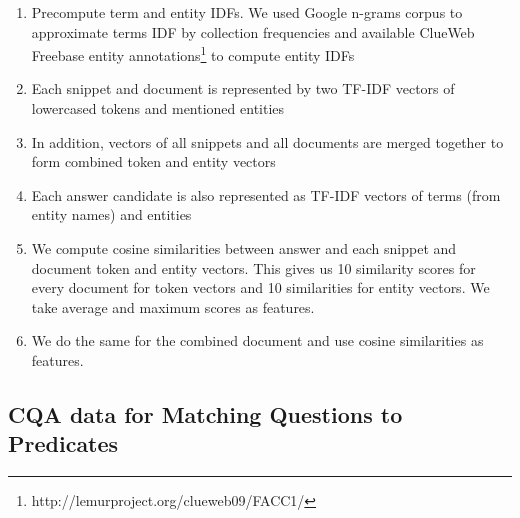 \begin{enumerate}[noitemsep,topsep=0pt]
\item Precompute term and entity IDFs. We used Google n-grams corpus to approximate terms IDF by collection frequencies and available ClueWeb Freebase entity annotations\footnote{http://lemurproject.org/clueweb09/FACC1/} to compute entity IDFs
\item Each snippet and document is represented by two TF-IDF vectors of lowercased tokens and mentioned entities
\item In addition, vectors of all snippets and all documents are merged together to form combined token and entity vectors
\item Each answer candidate is also represented as TF-IDF vectors of terms (from entity names) and entities
\item We compute cosine similarities between answer and each snippet and document token and entity vectors. This gives us 10 similarity scores for every document for token vectors and 10 similarities for entity vectors. We take average and maximum scores as features.
\item We do the same for the combined document and use cosine similarities as features.
\end{enumerate}

\subsection{CQA data for Matching Questions to Predicates}
\label{section:method:cqa}

